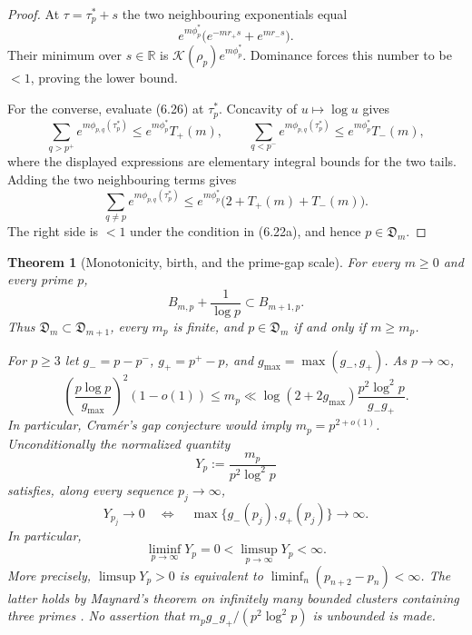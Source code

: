 \documentclass[11pt]{article}
\newtheorem{theorem}{Theorem}[section]
\theoremstyle{definition}
\theoremstyle{remark}
\newcommand{\R}{\mathbb R}
\begin{document}
\begin{proof}
At $\tau=\tau_p^*+s$ the two neighbouring exponentials equal
\[
 e^{m\phi_p^*}
 \bigl(e^{-mr_+s}+e^{mr_-s}\bigr).
\]
Their minimum over $s\in\R$ is
$\mathcal K(\rho_p)e^{m\phi_p^*}$.  Dominance forces this number to
be $<1$, proving the lower bound.

For the converse, evaluate (6.26) at $\tau_p^*$.  Concavity of
$u\mapsto\log u$ gives
\[
 \sum_{q>p^+}e^{m\phi_{p,q}(\tau_p^*)}
 \le e^{m\phi_p^*}T_+(m),
 \qquad
 \sum_{q<p^-}e^{m\phi_{p,q}(\tau_p^*)}
 \le e^{m\phi_p^*}T_-(m),
\]
where the displayed expressions are elementary integral bounds for
the two tails.  Adding the two neighbouring terms gives
\[
 \sum_{q\ne p}e^{m\phi_{p,q}(\tau_p^*)}
 \le e^{m\phi_p^*}\bigl(2+T_+(m)+T_-(m)\bigr).
\]
The right side is $<1$ under the condition in (6.22a), and hence
$p\in\mathfrak D_m$.
\end{proof}

\begin{theorem}[Monotonicity, birth, and the prime-gap scale]
\label{thm:band-birth}
For every $m\ge0$ and every prime $p$,
\[
 \boxed{
 B_{m,p}+\frac1{\log p}\subset B_{m+1,p}.}
\tag{6.23}
\]
Thus $\mathfrak D_m\subset\mathfrak D_{m+1}$, every $m_p$ is finite,
and $p\in\mathfrak D_m$ if and only if $m\ge m_p$.

For $p\ge3$ let $g_-=p-p^-$, $g_+=p^+-p$, and
$g_{\max}=\max(g_-,g_+)$.  As $p\to\infty$,
\[
 \left(\frac{p\log p}{g_{\max}}\right)^2(1-o(1))
 \le m_p
 \ll \log(2+2g_{\max})
       \frac{p^2\log^2p}{g_-g_+}.
\tag{6.24}
\]
In particular, Cram\'er's gap conjecture would imply $m_p=p^{2+o(1)}$.
Unconditionally the normalized quantity
\[
 Y_p:=\frac{m_p}{p^2\log^2p}
\]
satisfies, along every sequence $p_j\to\infty$,
\[
 Y_{p_j}\longrightarrow0
 \quad\Longleftrightarrow\quad
 \max\{g_-(p_j),g_+(p_j)\}\longrightarrow\infty.
\]
In particular,
\[
 \liminf_{p\to\infty}Y_p=0<\limsup_{p\to\infty}Y_p<\infty.
\tag{6.25}
\]
More precisely, $\limsup Y_p>0$ is equivalent to
$\liminf_n(p_{n+2}-p_n)<\infty$.  The latter holds by Maynard's theorem on
infinitely many bounded clusters containing three primes \cite{Maynard2015}.
No assertion that $m_pg_-g_+/(p^2\log^2p)$ is unbounded is made.
\end{theorem}
\end{document}
